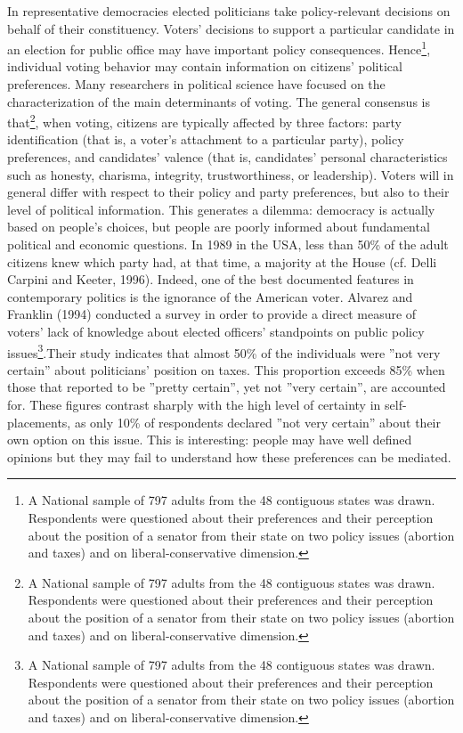 \documentclass[11pt,a4paper]{article}
\begin{document}
\noindent %
In representative democracies elected politicians take policy-relevant decisions on behalf of their constituency. Voters' decisions to support a particular candidate in an election for public office may have important policy consequences. Hence\footnote{A National sample of 797 adults from the 48 contiguous states was drawn. Respondents were questioned about their preferences and their perception about the position of a senator from their state on two policy issues (abortion and taxes) and on liberal-conservative dimension.}, individual voting behavior may contain information on citizens' political preferences. Many researchers in political science have focused on the characterization of the main determinants of voting. The general consensus is that\footnote{A National sample of 797 adults from the 48 contiguous states was drawn. Respondents were questioned about their preferences and their perception about the position of a senator from their state on two policy issues (abortion and taxes) and on liberal-conservative dimension.}, when voting, citizens are typically affected by three factors: party identification (that is, a voter's attachment to a particular party), policy preferences, and candidates' valence (that is, candidates' personal characteristics such as honesty, charisma, integrity, trustworthiness, or leadership). Voters will in general differ with respect to their policy and party preferences, but also to their level of political information. This generates a dilemma: democracy is actually based on people's choices, but people are poorly informed about fundamental political and economic questions. In 1989 in the USA, less than 50\% of the adult citizens knew which party had, at that time, a majority at the House (cf. Delli Carpini and Keeter, 1996). Indeed, one of the best documented features in contemporary politics is the ignorance of the American voter. Alvarez and Franklin (1994) conducted a survey in order to provide a direct measure of voters' lack of knowledge about elected officers' standpoints on public policy issues\footnote{A National sample of 797 adults from the 48 contiguous states was drawn. Respondents were questioned about their preferences and their perception about the position of a senator from their state on two policy issues (abortion and taxes) and on liberal-conservative dimension.}.Their study indicates that almost 50\% of the individuals were ''not very certain'' about politicians' position on taxes. This proportion exceeds 85\% when those that reported to be ''pretty certain'', yet not ''very certain'', are accounted for. These figures contrast sharply with the high level of certainty in self-placements, as only 10\% of respondents declared ''not very certain'' about their own option on this issue. This is interesting: people may have well defined opinions but they may fail to understand how these preferences can be mediated. \\
\end{document}
